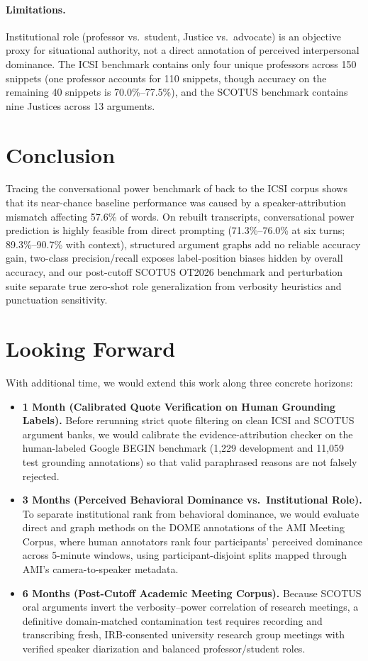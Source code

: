 \documentclass[11pt]{article}
\begin{document}
\paragraph{Limitations.}
Institutional role (professor vs.\ student, Justice vs.\ advocate) is an objective proxy for situational authority, not a direct annotation of perceived interpersonal dominance.
The ICSI benchmark contains only four unique professors across 150 snippets (one professor accounts for 110 snippets, though accuracy on the remaining 40 snippets is 70.0\%--77.5\%), and the SCOTUS benchmark contains nine Justices across 13 arguments.

\section{Conclusion}

Tracing the conversational power benchmark of \citet{wu2025power} back to the ICSI corpus shows that its near-chance baseline performance was caused by a speaker-attribution mismatch affecting 57.6\% of words.
On rebuilt transcripts, conversational power prediction is highly feasible from direct prompting (71.3\%--76.0\% at six turns; 89.3\%--90.7\% with context), structured argument graphs add no reliable accuracy gain, two-class precision/recall exposes label-position biases hidden by overall accuracy, and our post-cutoff SCOTUS OT2026 benchmark and perturbation suite separate true zero-shot role generalization from verbosity heuristics and punctuation sensitivity.

\section*{Looking Forward}

With additional time, we would extend this work along three concrete horizons:
\begin{itemize}
\setlength\itemsep{1pt}
\item \textbf{1 Month (Calibrated Quote Verification on Human Grounding Labels).} Before rerunning strict quote filtering on clean ICSI and SCOTUS argument banks, we would calibrate the evidence-attribution checker on the human-labeled Google BEGIN benchmark (1,229 development and 11,059 test grounding annotations) so that valid paraphrased reasons are not falsely rejected.
\item \textbf{3 Months (Perceived Behavioral Dominance vs.\ Institutional Role).} To separate institutional rank from behavioral dominance, we would evaluate direct and graph methods on the DOME annotations of the AMI Meeting Corpus, where human annotators rank four participants' perceived dominance across 5-minute windows, using participant-disjoint splits mapped through AMI's camera-to-speaker metadata.
\item \textbf{6 Months (Post-Cutoff Academic Meeting Corpus).} Because SCOTUS oral arguments invert the verbosity--power correlation of research meetings, a definitive domain-matched contamination test requires recording and transcribing fresh, IRB-consented university research group meetings with verified speaker diarization and balanced professor/student roles.
\end{itemize}
\end{document}
